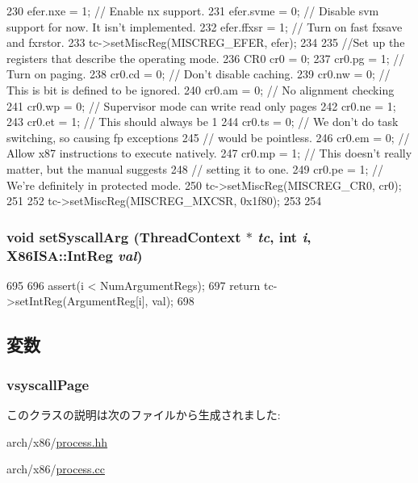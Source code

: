 \begin{DoxyCode}
{{230         efer.nxe = 1; // Enable nx support.
231         efer.svme = 0; // Disable svm support for now. It isn't implemented.
232         efer.ffxsr = 1; // Turn on fast fxsave and fxrstor.
233         tc->setMiscReg(MISCREG_EFER, efer);
234 
235         //Set up the registers that describe the operating mode.
236         CR0 cr0 = 0;
237         cr0.pg = 1; // Turn on paging.
238         cr0.cd = 0; // Don't disable caching.
239         cr0.nw = 0; // This is bit is defined to be ignored.
240         cr0.am = 0; // No alignment checking
241         cr0.wp = 0; // Supervisor mode can write read only pages
242         cr0.ne = 1;
243         cr0.et = 1; // This should always be 1
244         cr0.ts = 0; // We don't do task switching, so causing fp exceptions
245                     // would be pointless.
246         cr0.em = 0; // Allow x87 instructions to execute natively.
247         cr0.mp = 1; // This doesn't really matter, but the manual suggests
248                     // setting it to one.
249         cr0.pe = 1; // We're definitely in protected mode.
250         tc->setMiscReg(MISCREG_CR0, cr0);
251 
252         tc->setMiscReg(MISCREG_MXCSR, 0x1f80);
253     }
254 }
\end{DoxyCode}
\hypertarget{classX86ISA_1_1X86__64LiveProcess_a834e8e05416e3487f87d942259506abe}{
\subsubsection[{setSyscallArg}]{\setlength{\rightskip}{0pt plus 5cm}void setSyscallArg ({\bf ThreadContext} $\ast$ {\em tc}, \/  int {\em i}, \/  {\bf X86ISA::IntReg} {\em val})}}
\label{classX86ISA_1_1X86__64LiveProcess_a834e8e05416e3487f87d942259506abe}



\begin{DoxyCode}
695 {
696     assert(i < NumArgumentRegs);
697     return tc->setIntReg(ArgumentReg[i], val);
698 }
\end{DoxyCode}


\subsection{変数}
\hypertarget{classX86ISA_1_1X86__64LiveProcess_a9f7ed190dd32bddc3f1074ce39168abd}{
\subsubsection[{vsyscallPage}]{ {\bf vsyscallPage}}}
\label{classX86ISA_1_1X86__64LiveProcess_a9f7ed190dd32bddc3f1074ce39168abd}


このクラスの説明は次のファイルから生成されました:\begin{DoxyCompactItemize}
\item 
arch/x86/\hyperlink{arch_2x86_2process_8hh}{process.hh}\item 
arch/x86/\hyperlink{arch_2x86_2process_8cc}{process.cc}\end{DoxyCompactItemize}
